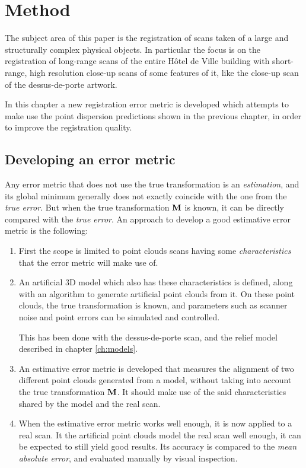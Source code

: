 \chapter{Method} \label{ch:method}
The subject area of this paper is the registration of scans taken of a large and structurally complex physical objects. In particular the focus is on the registration of long-range scans of the entire Hôtel de Ville building with short-range, high resolution close-up scans of some features of it, like the close-up scan of the dessus-de-porte artwork.

In this chapter a new registration error metric is developed which attempts to make use the point dispersion predictions shown in the previous chapter, in order to improve the registration quality.


\section{Developing an error metric}
Any error metric that does not use the true transformation is an \emph{estimation}, and its global minimum generally does not exactly coincide with the one from the \emph{true error}. But when the true transformation $\mathbf{M}$ is known, it can be directly compared with the \emph{true error}. An approach to develop a good estimative error metric is the following:
\begin{enumerate} 
\item First the scope is limited to point clouds scans having some \emph{characteristics} that the error metric will make use of.

\item An artificial 3D model which also has these characteristics is defined, along with an algorithm to generate artificial point clouds from it. On these point clouds, the true transformation is known, and parameters such as scanner noise and point errors can be simulated and controlled.

This has been done with the dessus-de-porte scan, and the relief model described in chapter \ref{ch:models}.

\item An estimative error metric is developed that measures the alignment of two different point clouds generated from a model, without taking into account the true transformation $\mathbf{M}$. It should make use of the said characteristics shared by the model and the real scan.

\item When the estimative error metric works well enough, it is now applied to a real scan. It the artificial point clouds model the real scan well enough, it can be expected to still yield good results. Its accuracy is compared to the \emph{mean absolute error}, and evaluated manually by visual inspection.
\end{enumerate}

